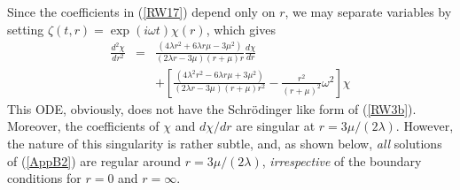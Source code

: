 \documentclass[12pt,aps,floats,showpacs,amssymb,tightenlines]{revtex4}
\begin{document}
Since the coefficients in (\ref{RW17}) depend only on $r$, we may
separate variables by setting $\zeta(t,r)=\exp(i \omega t) \chi(r)$,
which gives
\begin{eqnarray}
\label{AppB2} {\frac {d^2 \chi}{d{r}^{2}}} & = &
 {\frac { \left(
4 \lambda {r}^{2}+6  \lambda r\mu -3{\mu}^{2} \right)  }{
 \left( 2  \lambda  r-3\mu \right)  \left( r+\mu
 \right) r}}{\frac {d \chi}{dr}} \nonumber \\ & &
+\left[{\frac { \left( 4{\lambda}^{2}{r}^{2}-6 \lambda
r\mu+3{\mu}^{2} \right)
  }{ \left( 2  \lambda  r-3\mu \right)
 \left( r+\mu \right) {r}^{2}}}  -\frac{r^2}{(r+\mu)^2}\omega^2 \right]{\chi}
\end{eqnarray}
This ODE, obviously, does not have the Schr\"odinger like form of
(\ref{RW3b}). Moreover, the coefficients of $\chi$ and $d \chi/dr$
are singular at $r=3 \mu /  (2 \lambda)$. However, the nature of
this singularity is rather subtle, and, as shown below, {\em all}
solutions of (\ref{AppB2}) are regular around $r=3\mu /(2 \lambda)
$, {\em irrespective} of the
boundary conditions for $r=0$ and $r=\infty$.\\
\end{document}
